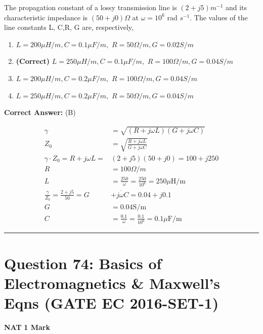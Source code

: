 \documentclass[11pt,a4paper]{article}
\begin{document}
\noindent The propagation constant of a lossy transmission line is $(2 +j5) m^{-1}$
and its characteristic impedance is $(50 + j0) \Omega$ at $\omega = 10^{6}$ rad $s^{-1}$. The values of the line constants L, C,R, G are, respectively,


\begin{enumerate}[label=(\Alph*)]
    \item $L=200\mu H/m, C=0.1 \mu F/m,$ $R=50\Omega /m, G=0.02 S/m$
    \item \textbf{(Correct)} $L=250\mu H/m, C=0.1 \mu F/m,$ $R=100\Omega /m, G=0.04 S/m$
    \item $L=200\mu H/m, C=0.2 \mu F/m,$ $R=100\Omega /m, G=0.04 S/m$
    \item $L=250\mu H/m, C=0.2 \mu F/m,$ $R=50\Omega /m, G=0.04 S/m$
\end{enumerate}

\noindent \textbf{Correct Answer:} (B)

\begin{tcolorbox}[solbox, title=Detailed Solution -- Question 73]
\[
\begin{aligned} \gamma &=\sqrt{(R+j \omega L)(G+j \omega C)} \\ Z_{0} &=\sqrt{\frac{R+j \omega L}{G+j \omega C}} \\ \gamma \cdot Z_{0}=R+j \omega L =&(2+j 5)(50+j 0)=100+j 250 \\ R &=100 \Omega / m \\ L &=\frac{250}{\omega}=\frac{250}{10^{6}}=250 \mu \mathrm{H} / \mathrm{m} \\ \frac{\gamma}{Z_{0}}=\frac{2+j 5}{50}=G &+\dot{j \omega C}=0.04+j 0.1 \\ G &=0.04 \mathrm{S} / \mathrm{m} \\ C &=\frac{0.1}{\omega}=\frac{0.1}{10^{6}}=0.1 \mu \mathrm{F} / \mathrm{m} \end{aligned}
\]
\end{tcolorbox}

\vspace{1.5em}
\hrule
\vspace{1.5em}

\section*{Question 74: Basics of Electromagnetics \& Maxwell's Eqns (GATE EC 2016-SET-1)}
\noindent \textbf{\color{primary}NAT} \hfill \textbf{\color{secondary}1 Mark}
\end{document}
